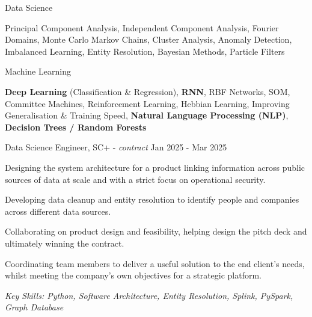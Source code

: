 \documentclass[11pt,article,oneside]{memoir}
\newenvironment{itemize*}{%
  \renewcommand\labelitemi{\textbullet}
  \footnotesize
  \begin{itemize}%
    \setlength{\itemsep}{0pt}}%
  {\end{itemize}
}
\begin{document}
\ind Data Science

\ind \hspace{0.354in} \footnotesize Principal Component Analysis, Independent Component Analysis, Fourier Domains,
Monte Carlo Markov Chains, Cluster Analysis, Anomaly Detection, Imbalanced Learning, Entity Resolution, Bayesian Methods, Particle Filters \normalsize

\ind Machine Learning 

\ind \hspace{0.354in} \footnotesize \textbf{Deep Learning} (Classification \& Regression), \textbf{RNN}, RBF Networks, SOM, Committee Machines,
Reinforcement Learning, Hebbian Learning, Improving Generalisation \& Training Speed, \textbf{Natural Language Processing (NLP)}, \textbf{Decision Trees / Random Forests} \normalsize

\bigskip
 

\normalsize
\medskip
\ind Data Science Engineer, SC+ - \emph{contract} \hfill Jan 2025 - Mar 2025
\begin{itemize*}
    \item Designing the system architecture for a product linking information across public sources of data at scale and with a strict focus on operational security.
    \item Developing data cleanup and entity resolution to identify people and companies across different data sources.
    \item Collaborating on product design and feasibility, helping design the pitch deck and ultimately winning the contract.
    \item Coordinating team members to deliver a useful solution to the end client's needs, whilst meeting the company's own objectives for a strategic platform. 
\end{itemize*}
\ind \hspace{0.35in} \footnotesize \emph{Key Skills: Python, Software Architecture, Entity Resolution, Splink, PySpark, Graph Database}
\end{document}
